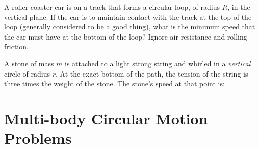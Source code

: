 \begin{example}
  A roller coaster car is on a track that forms a circular loop, of radius $R$,
  in the vertical plane. If the car is to maintain contact with the track at
  the top of the loop (generally considered to be a good thing), what is the
  minimum speed that the car must have at the bottom of the loop? Ignore air
  resistance and rolling friction.
\end{example}

\begin{example}
  A stone of mass $m$ is attached to a light strong string and whirled in a
  \emph{vertical} circle of radius $r$. At the exact bottom of the path, the
  tension of the string is three times the weight of the stone. The stone's
  speed at that point is:
\end{example}



\section{Multi-body Circular Motion Problems}



